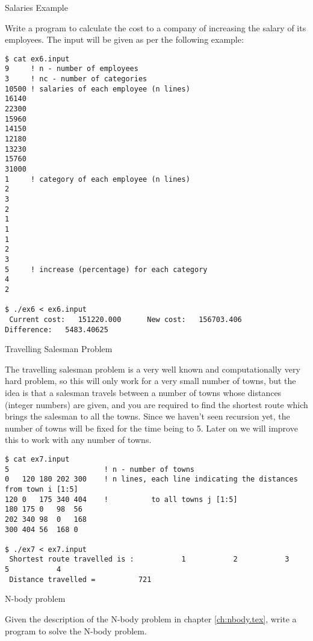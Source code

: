 {Salaries Example}

Write a program to calculate the cost to a company of increasing the salary of
its employees. The input will be given as per the following example:

\begin{verbatim}
$ cat ex6.input
9     ! n - number of employees
3     ! nc - number of categories
10500 ! salaries of each employee (n lines)
16140
22300
15960
14150
12180
13230
15760
31000
1     ! category of each employee (n lines)
2
3
2
1
1
1
2
3
5     ! increase (percentage) for each category
4
2

$ ./ex6 < ex6.input
 Current cost:   151220.000      New cost:   156703.406     Difference:   5483.40625    
\end{verbatim}


 {Travelling Salesman Problem}

The travelling salesman problem is a very well known and computationally very
hard problem, so this will only work for a very small number of towns, but the
idea is that a salesman travels between a number of towns whose distances
(integer numbers) are given, and you are required to find the shortest route
which brings the salesman to all the towns. Since we haven't seen recursion yet,
the number of towns will be fixed for the time being to 5. Later on we will
improve this to work with any number of towns.

\begin{verbatim}
$ cat ex7.input
5                      ! n - number of towns
0   120 180 202 300    ! n lines, each line indicating the distances from town i [1:5]
120 0   175 340 404    !          to all towns j [1:5]
180 175 0   98  56
202 340 98  0   168
300 404 56  168 0

$ ./ex7 < ex7.input
 Shortest route travelled is :           1           2           3           5           4
 Distance travelled =          721
\end{verbatim}

 {N-body problem}

Given the description of the N-body problem in chapter \ref{ch:nbody.tex}, write
a program to solve the N-body problem.




